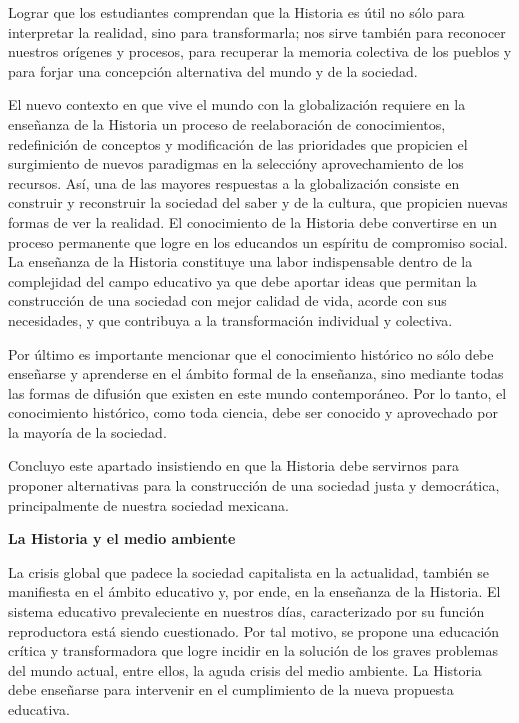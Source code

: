 Lograr que los estudiantes comprendan que la Historia es útil no sólo 
para interpretar la realidad, sino para transformarla; nos sirve 
también para reconocer nuestros orígenes y procesos, para recuperar la 
memoria colectiva de los pueblos y para forjar una concepción 
alternativa del mundo y de la sociedad.  

El nuevo contexto en que vive el mundo con la globalización requiere en 
la enseñanza de la Historia un proceso de reelaboración de 
conocimientos, redefinición de conceptos y modificación de las 
prioridades que propicien el surgimiento de nuevos paradigmas en la 
selección\linebreak y aprovechamiento de los recursos. Así, una de las mayores 
respuestas a la globalización consiste en construir y reconstruir la 
sociedad del saber y de la cultura, que propicien nuevas formas de ver 
la realidad. El conocimiento de la Historia debe convertirse en un 
proceso permanente que logre en los educandos un espíritu de compromiso 
social. La enseñanza de la Historia constituye una labor indispensable 
dentro de la complejidad del campo educativo ya que debe aportar ideas 
que permitan la construcción de una sociedad con mejor calidad de vida, 
acorde con sus necesidades, y que contribuya a la transformación 
individual y colectiva. 

Por último es importante mencionar que el conocimiento histórico no 
sólo debe enseñarse y aprenderse en el ámbito formal de la enseñanza, 
sino mediante todas las formas de difusión que existen en este mundo 
contemporáneo. Por lo tanto, el conocimiento histórico, como toda 
ciencia, debe ser conocido y aprovechado por la mayoría de la sociedad. 

Concluyo este apartado insistiendo en que la Historia debe servirnos 
para proponer alternativas para la construcción de una sociedad justa y 
democrática, principalmente de nuestra sociedad mexicana.
\enlargethispage{-1\baselineskip}

\medskip
{\bfseries La Historia y el medio ambiente}

La crisis global que padece la sociedad capitalista en la actualidad,  también se manifiesta en el ámbito educativo y, por ende, en la enseñanza de la Historia. El sistema educativo prevaleciente en 
nuestros días, caracterizado por su función reproductora está siendo 
cuestionado. Por tal motivo, se propone una educación crítica y 
transformadora que logre incidir en la solución de los graves problemas del mundo actual, entre ellos, la aguda crisis del medio ambiente. La Historia debe enseñarse para intervenir en el cumplimiento de la nueva propuesta educativa.  


